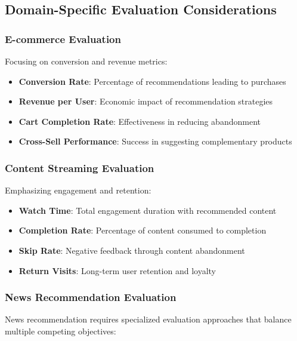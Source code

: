 \subsection{Domain-Specific Evaluation Considerations}

\subsubsection{E-commerce Evaluation}

Focusing on conversion and revenue metrics:

\begin{itemize}
    \item \textbf{Conversion Rate}: Percentage of recommendations leading to purchases
    \item \textbf{Revenue per User}: Economic impact of recommendation strategies
    \item \textbf{Cart Completion Rate}: Effectiveness in reducing abandonment
    \item \textbf{Cross-Sell Performance}: Success in suggesting complementary products
\end{itemize}

\subsubsection{Content Streaming Evaluation}

Emphasizing engagement and retention:

\begin{itemize}
    \item \textbf{Watch Time}: Total engagement duration with recommended content
    \item \textbf{Completion Rate}: Percentage of content consumed to completion
    \item \textbf{Skip Rate}: Negative feedback through content abandonment
    \item \textbf{Return Visits}: Long-term user retention and loyalty
\end{itemize}

\subsubsection{News Recommendation Evaluation}

News recommendation requires specialized evaluation approaches that balance multiple competing objectives:

